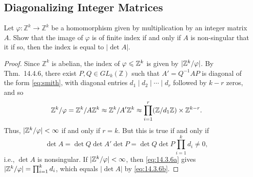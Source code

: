 \documentclass[12pt]{article}
\theoremstyle{remark}
\let\Im\relax
\DeclareMathOperator{\Im}{im}
\newcommand{\GL}{\mathit{GL}}
\begin{document}
\setcounter{subsection}{3}
\subsection{Diagonalizing Integer Matrices}
\setcounter{subsubsection}{5}
\begin{problem}
  Let $\varphi\colon \mathbb{Z}^k \to \mathbb{Z}^k$ be a homomorphism given by multiplication by an integer matrix $A$.  Show that the image of $\varphi$ is of finite index if and only if $A$ is non-singular that it if so, then the index is equal to $\lvert\det A\rvert$.
\end{problem}
\begin{proof}
  Since $\mathbb{Z}^k$ is abelian, the index of $\Im\varphi \leqslant \mathbb{Z}^k$ is given by $\lvert \mathbb{Z}^k/\Im\varphi \rvert$. By Thm.~14.4.6, there exist $P,Q \in \GL_k(\mathbb{Z})$ such that $A' = Q^{-1}AP$ is diagonal of the form \eqref{eq:smith}, with diagonal entries $d_1 \mid d_2 \mid \cdots \mid d_r$ followed by $k-r$ zeros, and so
  \begin{equation}\label{eq:14.3.6a}
    \mathbb{Z}^k/\Im\varphi = \mathbb{Z}^k/A\mathbb{Z}^k \approx \mathbb{Z}^k/A'\mathbb{Z}^k \approx \prod_{i=1}^r (\mathbb{Z}/d_1\mathbb{Z}) \times \mathbb{Z}^{k-r}.
  \end{equation}
  Thus, $\lvert \mathbb{Z}^k/\Im\varphi \rvert < \infty$ if and only if $r=k$. But this is true if and only if
  \begin{equation}\label{eq:14.3.6b}
    \det A = \det Q\det A'\det P = \det Q \det P \prod_{i=1}^k d_i \ne 0,
  \end{equation}
  i.e., $\det A$ is nonsingular. If $\lvert \mathbb{Z}^k/\Im\varphi \rvert < \infty$, then \eqref{eq:14.3.6a} gives $\lvert \mathbb{Z}^k/\Im\varphi\rvert = \prod_{i=1}^k d_i$, which equals $\lvert \det A \rvert$ by \eqref{eq:14.3.6b}.
\end{proof}
\end{document}
